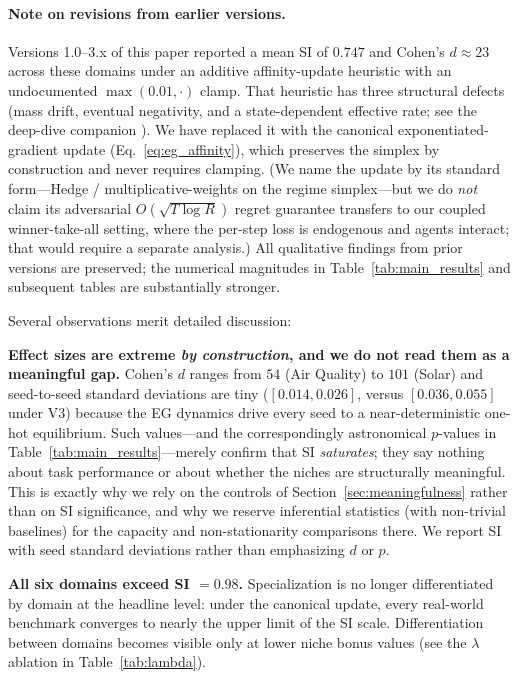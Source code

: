 \documentclass{article}
\begin{document}
\paragraph{Note on revisions from earlier versions.}
Versions 1.0--3.x of this paper reported a mean SI of $0.747$ and Cohen's
$d \approx 23$ across these domains under an additive affinity-update
heuristic with an undocumented $\max(0.01,\cdot)$ clamp. That heuristic
has three structural defects (mass drift, eventual negativity, and a
state-dependent effective rate; see the deep-dive companion
\cite{li2026emergent}). We have replaced it with the canonical
exponentiated-gradient update (Eq.~\eqref{eq:eg_affinity}), which
preserves the simplex by construction and never requires clamping.
(We name the update by its standard form---Hedge / multiplicative-weights
on the regime simplex---but we do \emph{not} claim its adversarial
$O(\sqrt{T\log R})$ regret guarantee transfers to our coupled
winner-take-all setting, where the per-step loss is endogenous and agents
interact; that would require a separate analysis.) All
qualitative findings from prior versions are preserved; the numerical
magnitudes in Table~\ref{tab:main_results} and subsequent tables are
substantially stronger.

Several observations merit detailed discussion:

\textbf{Effect sizes are extreme \emph{by construction}, and we do not read them as a meaningful gap.} Cohen's $d$ ranges from $54$ (Air Quality) to $101$ (Solar) and seed-to-seed standard deviations are tiny ($[0.014, 0.026]$, versus $[0.036, 0.055]$ under V3) because the EG dynamics drive every seed to a near-deterministic one-hot equilibrium. Such values---and the correspondingly astronomical $p$-values in Table~\ref{tab:main_results}---merely confirm that SI \emph{saturates}; they say nothing about task performance or about whether the niches are structurally meaningful. This is exactly why we rely on the controls of Section~\ref{sec:meaningfulness} rather than on SI significance, and why we reserve inferential statistics (with non-trivial baselines) for the capacity and non-stationarity comparisons there. We report SI with seed standard deviations rather than emphasizing $d$ or $p$.

\textbf{All six domains exceed SI $= 0.98$.} Specialization is no longer differentiated by domain at the headline level: under the canonical update, every real-world benchmark converges to nearly the upper limit of the SI scale. Differentiation between domains becomes visible only at lower niche bonus values (see the $\lambda$ ablation in Table~\ref{tab:lambda}).
\end{document}
